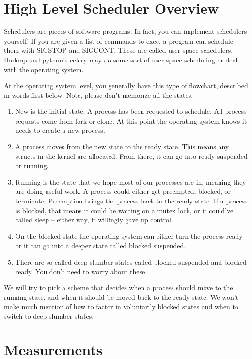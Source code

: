 \section{High Level Scheduler Overview}

Schedulers are pieces of software programs. In fact, you can implement schedulers yourself!
If you are given a list of commands to exec, a program can schedule them with SIGSTOP and SIGCONT.
These are called user space schedulers.
Hadoop and python's celery may do some sort of user space scheduling or deal with the operating system.

At the operating system level, you generally have this type of flowchart, described in words first below.
Note, please don't memorize all the states.

\begin{enumerate}
\item New is the initial state. A process has been requested to schedule. All process requests come from fork or clone. At this point the operating system knows it needs to create a new process.
\item A process moves from the new state to the ready state. This means any structs in the kernel are allocated. From there, it can go into ready suspended or running.
\item Running is the state that we hope most of our processes are in, meaning they are doing useful work. A process could either get preempted, blocked, or terminate. Preemption brings the process back to the ready state. If a process is blocked, that means it could be waiting on a mutex lock, or it could've called sleep -- either way, it willingly gave up control.
\item On the blocked state the operating system can either turn the process ready or it can go into a deeper state called blocked suspended.
\item There are so-called deep slumber states called blocked suspended and blocked ready. You don't need to worry about these.
\end{enumerate}

We will try to pick a scheme that decides when a process should move to the running state, and when it should be moved back to the ready state.
We won't make much mention of how to factor in voluntarily blocked states and when to switch to deep slumber states.

\section{Measurements}

